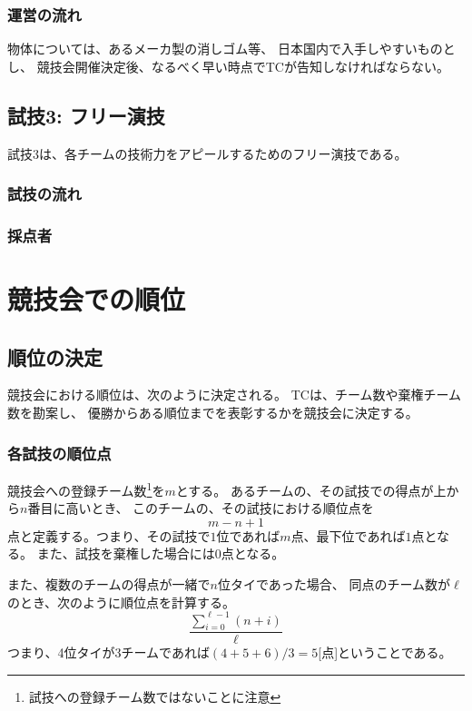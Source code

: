 \documentclass[a4j]{jarticle}
\begin{document}
\subsubsection{運営の流れ}

物体については、あるメーカ製の消しゴム等、
日本国内で入手しやすいものとし、
競技会開催決定後、なるべく早い時点でTCが告知しなければならない。

\subsection{試技3: フリー演技}

試技3は、各チームの技術力をアピールするためのフリー演技である。

\subsubsection{試技の流れ}

\subsubsection{採点者}

\section{競技会での順位}

\subsection{順位の決定}

競技会における順位は、次のように決定される。
TCは、チーム数や棄権チーム数を勘案し、
優勝からある順位までを表彰するかを競技会に決定する。

\subsubsection{各試技の順位点}

競技会への登録チーム数\footnote{試技への登録チーム数ではないことに注意}を$m$とする。
あるチームの、その試技での得点が上から$n$番目に高いとき、
このチームの、その試技における順位点を
\[
	m - n + 1
\]
点と定義する。つまり、その試技で$1$位であれば$m$点、最下位であれば$1$点となる。
また、試技を棄権した場合には$0$点となる。

また、複数のチームの得点が一緒で$n$位タイであった場合、
同点のチーム数が$\ell$のとき、次のように順位点を計算する。
\[
	\dfrac{\sum_{i=0}^{\ell-1}(n + i)}{\ell}
\]
つまり、4位タイが3チームであれば$(4+5+6)/3=5$[点]ということである。
\end{document}

